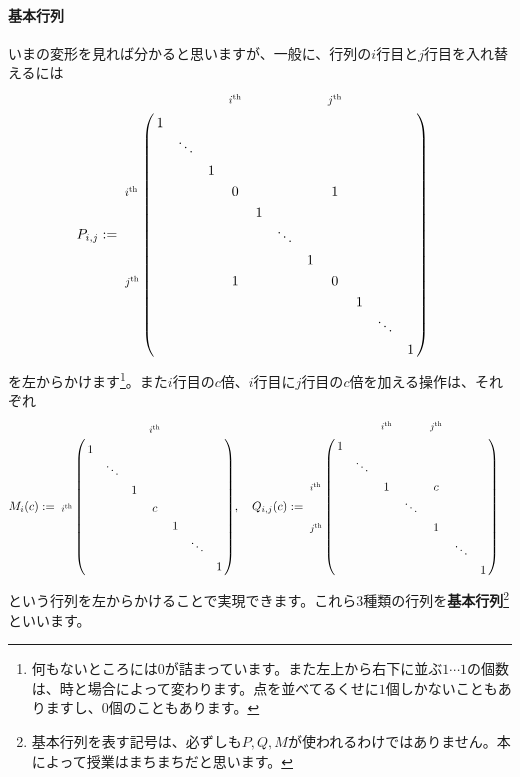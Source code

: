 \paragraph{基本行列} いまの変形を見れば分かると思いますが、一般に、行列の$i$行目と$j$行目を入れ替えるには
\begin{align*}
P_{i,j} &:= 
\bordermatrix{
& & & & \scalebox{0.8}{$i^{\text{th}}$} & & & & \scalebox{0.8}{$j^{\text{th}}$} \\
& 1 & \\
& & \ddots  &  \\
& & & 1 \\
\scalebox{0.8}{$i^{\text{th}}$} & & & & 0 & & & & 1 \\
& & & & & 1 &  \\
& & & & & & \ddots &  \\
& & & & & & & 1  \\
\scalebox{0.8}{$j^{\text{th}}$} & & & & 1 & & & & 0 \\
& & & & & & & & & 1 \\
& & & & & & & & & & \ddots \\
& & & & & & & & & & & 1 
}
\end{align*}
を左からかけます\footnote{何もないところには$0$が詰まっています。また左上から右下に並ぶ$1 \cdots 1$の個数は、時と場合によって変わります。点を並べてるくせに$1$個しかないこともありますし、$0$個のこともあります。}。また$i$行目の$c$倍、$i$行目に$j$行目の$c$倍を加える操作は、それぞれ
\begin{align*}
M_i(c) &:=
\bordermatrix{
& & & & \scalebox{0.8}{$i^{\text{th}}$} \\
& 1 & \\
& & \ddots \\
& & & 1 \\
\scalebox{0.8}{$i^{\text{th}}$} & & & & c \\
& & & & & 1 \\
& & & & & & \ddots \\
& & & & & & & 1
}, \quad
Q_{i,j}(c) :=
\bordermatrix{
&  &  & \scalebox{0.8}{$i^{\text{th}}$} & & \scalebox{0.8}{$j^{\text{th}}$} \\
& 1 & \\
& & \ddots \\
\scalebox{0.8}{$i^{\text{th}}$} & & & 1 &  & c \\
& & & & \ddots &  \\
\scalebox{0.8}{$j^{\text{th}}$} & & & & & 1 \\
& & & & & & \ddots \\
& & & & & & & 1
}
\end{align*}
という行列を左からかけることで実現できます。これら$3$種類の行列を\textbf{基本行列}\footnote{基本行列を表す記号は、必ずしも$P, Q, M$が使われるわけではありません。本によって授業はまちまちだと思います。}といいます。

